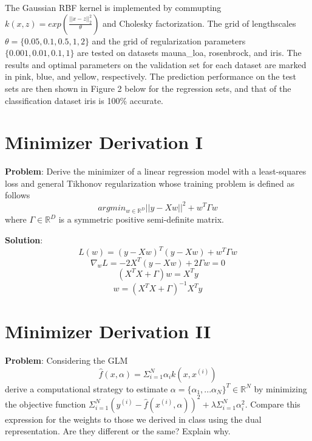 \documentclass{article} %
\begin{document}
The Gaussian RBF kernel is implemented by commupting $k(x,z) = exp(\frac{||x-z||_2^2}{\theta})$ and Cholesky factorization. The grid of lengthscales $\theta = \{0.05, 0.1, 0.5, 1, 2\}$ and the grid of regularization parameters $\{0.001, 0.01, 0.1, 1\}$ are tested on datasets mauna\_loa, rosenbrock, and iris. The results and optimal parameters on the validation set for each dataset are marked in pink, blue, and yellow, respectively. The prediction performance on the test sets are then shown in Figure 2 below for the regression sets, and that of the classification dataset iris is 100\% accurate.



\vspace{0.4cm}
\section*{Minimizer Derivation I}
\textbf{Problem}: Derive the minimizer of a linear regression model with a least-squares loss and general Tikhonov regularization whose training problem is defined as follows
$$argmin_{w\in \mathbb{R}^D} ||y - Xw||^2 + w^T\Gamma w$$
where $\Gamma\in \mathbb{R}^D$ is a symmetric positive semi-definite matrix.

\textbf{Solution}:
$$L(w) = (y-Xw)^T(y-Xw)+ w^T\Gamma w$$
$$\nabla_wL = -2X^T(y-Xw)+ 2\Gamma w = 0$$
$$(X^TX+\Gamma)w = X^Ty$$
$$w = (X^TX+\Gamma)^{-1}X^Ty$$


\vspace{0.4cm}
\section*{Minimizer Derivation II}
\textbf{Problem}: Considering the GLM
$$\hat f(x, \alpha) = \Sigma_{i=1}^N \alpha_i k(x, x^{(i)})$$ derive a computational strategy to estimate $\alpha = \{\alpha_1, ... \alpha_N\}^T\in \mathbb{R}^N$ by minimizing the objective function $\Sigma_{i=1}^N (y^{(i)}-\hat f(x^{(i)}, \alpha))^2+ \lambda\Sigma_{i=1}^N \alpha_i^2$. Compare this expression for the weights to those we derived in class using the dual representation. Are they different or the same? Explain why.
\end{document}
